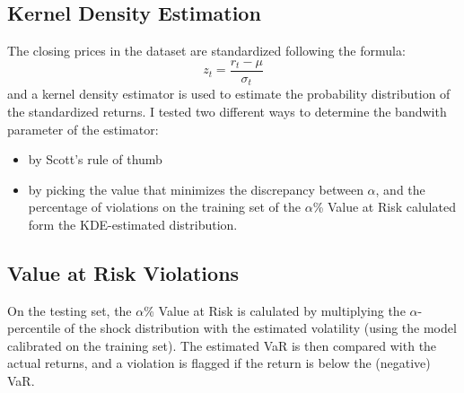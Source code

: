 \documentclass[12pt]{article}
\begin{document}
    \subsection{Kernel Density Estimation}
        The closing prices in the dataset are standardized following the formula:
        \begin{equation}
            z_t = \frac{r_t - \mu}{\sigma_t}
        \end{equation}
        and a kernel density estimator is used to estimate the probability distribution of the standardized returns.
        I tested two different ways to determine the bandwith parameter of the estimator:
        \begin{itemize}
            \item by Scott’s rule of thumb
            \item by picking the value that minimizes the discrepancy between $\alpha$, and the percentage of violations on the training set of the $\alpha$\% Value at Risk calulated form the KDE-estimated distribution.
        \end{itemize}

    \subsection{Value at Risk Violations}
        On the testing set, the $\alpha$\% Value at Risk is calulated by multiplying the $\alpha$-percentile of the shock distribution with the estimated volatility (using the model calibrated on the training set).
        The estimated VaR is then compared with the actual returns, and a violation is flagged if the return is below the (negative) VaR.
\end{document}

